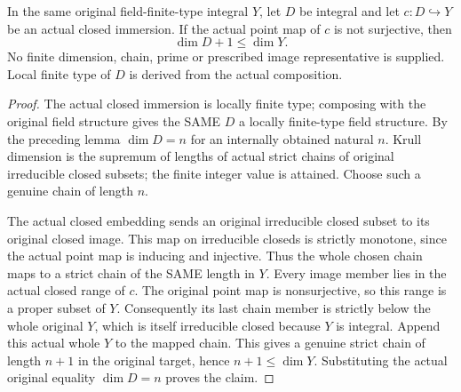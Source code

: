 \begin{theorem}
\label{thm:pl-gauss-original-proper-closed-image-strict-dimension}
\leanok
In the same original field-finite-type integral $Y$, let $D$ be integral
and let $c:D\hookrightarrow Y$ be an actual closed immersion. If the
actual point map of $c$ is not surjective, then
\[
 \dim D+1\le\dim Y.
\]
No finite dimension, chain, prime or prescribed image representative is
supplied. Local finite type of $D$ is derived from the actual composition.
\end{theorem}
\begin{proof}
The actual closed immersion is locally finite type; composing with the
original field structure gives the SAME $D$ a locally finite-type field
structure. By the preceding lemma $\dim D=n$ for an internally obtained
natural $n$. Krull dimension is the supremum of lengths of actual strict
chains of original irreducible closed subsets; the finite integer value
is attained. Choose such a genuine chain of length $n$.

The actual closed embedding sends an original irreducible closed subset
to its original closed image. This map on irreducible closeds is strictly
monotone, since the actual point map is inducing and injective. Thus the
whole chosen chain maps to a strict chain of the SAME length in $Y$.
Every image member lies in the actual closed range of $c$. The original
point map is nonsurjective, so this range is a proper subset of $Y$.
Consequently its last chain member is strictly below the whole original
$Y$, which is itself irreducible closed because $Y$ is integral. Append
this actual whole $Y$ to the mapped chain. This gives a genuine strict
chain of length $n+1$ in the original target, hence $n+1\le\dim Y$.
Substituting the actual original equality $\dim D=n$ proves the claim.
\end{proof}

